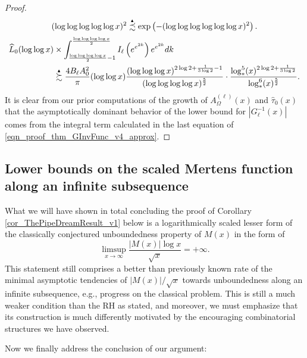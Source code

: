 \documentclass[11pt,reqno,a4letter]{article}
\numberwithin{figure}{section}
\numberwithin{table}{section}
\theoremstyle{plain}
\numberwithin{theorem}{section}
\theoremstyle{definition}
\newcommand{\SuccSim}[0]{\overset{_{\scriptsize{\blacktriangle}}}{\succsim}}
\newcommand{\PrecSim}[0]{\overset{_{\scriptsize{\blacktriangle}}}{\precsim}}
\begin{document}
\begin{proof}
{     \[
     (\log\log\log\log\log x)^2 \PrecSim \exp\left(-(\log\log\log\log\log\log x)^2\right). 
     \]
} 
\begin{align} 
\label{eqn_proof_thm_GInvFunc_v4_approx} 
\widehat{L}_0(\log\log x) & \times \int_{\frac{\log\log\log\log x}{2}-1}^{\frac{\log\log\log\log x}{2}} 
     I_{\ell}\left(e^{e^{2k}}\right) 
     e^{e^{2k}} dk \\ 
\notag 
     & \SuccSim 
     \frac{4 B_{\ell} A_0^2}{\pi} (\log\log x) \frac{(\log\log\log x)^{2\log 2+\frac{1}{3\log 2} - 1}}{ 
     (\log\log\log\log x)^{\frac{5}{2}}} \cdot \frac{\log_{\ast}^5(x)^{2\log 2 + \frac{1}{3\log 2}}}{ 
     \log_{\ast}^{6}(x)^{\frac{5}{2}}}. 
\end{align} 
It is clear from our prior computations of the growth of 
$A_{\Omega}^{(\ell)}(x)$ and $\widehat{\tau}_0(x)$ 
that the asymptotically dominant behavior of the lower bound for 
$|G_{\ell}^{-1}(x)|$ comes from the integral term calculated in the last equation of 
\eqref{eqn_proof_thm_GInvFunc_v4_approx}. 
\end{proof} 

\subsection{Lower bounds on the scaled Mertens function along an infinite subsequence}
\label{subSection_TheCoreResultProof} 

What we will have shown in total concluding the proof of 
Corollary \ref{cor_ThePipeDreamResult_v1} below is a 
logarithmically scaled lesser form of the classically conjectured 
unboundedness property of $M(x)$ in the form of 
\[
\limsup_{x \rightarrow \infty} \frac{|M(x)| \log x}{\sqrt{x}} = +\infty. 
\]
This statement still comprises a better than previously known rate of the minimal asymptotic tendencies of 
$|M(x)| / \sqrt{x}$ towards unboundedness along an infinite subsequence, 
e.g., progress on the classical problem. 
This is still a much weaker condition than the RH as stated, and moreover, 
we must emphasize that its construction is much differently 
motivated by the encouraging combinatorial structures we have observed. 

Now we finally address the conclusion of our argument: 
\end{document}

